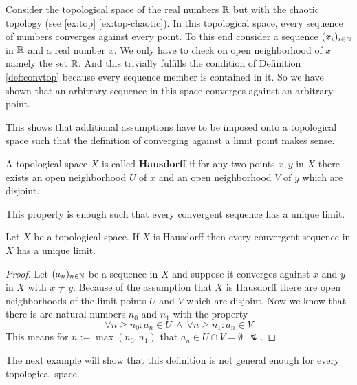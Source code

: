 \begin{ex}
  Consider the topological space of the real numbers $\mathbb{R}$ but with the chaotic topology (see \ref{ex:top} \ref{ex:top-chaotic}). In this topological space, every sequence of numbers converges against every point. To this end consider a sequence $(x_i)_{i\in\mathbb{N}}$ in $\mathbb{R}$ and a real number $x$. We only have to check on open neighborhood of $x$ namely the set $\mathbb{R}$. And this trivially fulfills the condition of Definition \ref{def:convtop} because every sequence member is contained in it. So we have shown that an arbitrary sequence in this space converges against an arbitrary point.  
\end{ex}

This shows that additional assumptions have to be imposed onto a topological space such that the definition of converging against a limit point makes sense.

\begin{defin}
  A topological space $X$ is called \textbf{Hausdorff} if for any two points $x, y$ in $X$ there exists an open neighborhood $U$ of $x$ and an open neighborhood $V$ of $y$ which are disjoint.   
\end{defin}

This property is enough such that every convergent sequence has a unique limit.

\begin{thm}
  Let $X$ be a topological space. If $X$ is Hausdorff then every convergent sequence in $X$ has a unique limit.
\end{thm}

\begin{proof}
  Let $(a_n)_{n \in \mathbb{N}}$ be a sequence in $X$ and suppose it converges against $x$ and $y$ in $X$ with $x \neq y$. 
  Because of the assumption that $X$ is Hausdorff there are open neighborhoods of the limit points $U$ and $V$ which are disjoint. 
  Now we know that there is are natural numbers $n_0$ and $n_1$ with the property
  \begin{equation*}
    \forall n \geq n_0\colon a_n \in U \: \land \: \forall n \geq n_1\colon a_n \in V
  \end{equation*}
  This means for $n := \max(n_0, n_1)$ that $a_n \in U \cap V = \emptyset \:\: \lightning$.
\end{proof}

The next example will show that this definition is not general enough for every topological space.

